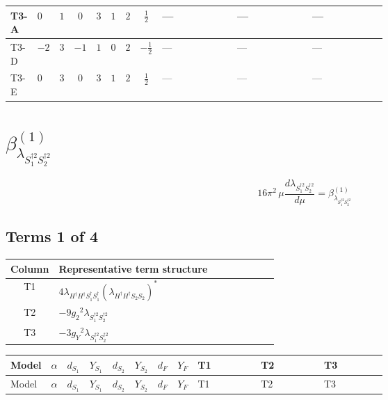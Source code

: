\documentclass[8pt]{article}
\begin{document}
\begin{landscape}
\begin{longtable}{@{}llcccccc >{\raggedright\arraybackslash}p{0.21\linewidth} >{\raggedright\arraybackslash}p{0.21\linewidth} >{\raggedright\arraybackslash}p{0.21\linewidth}@{}}
\midrule
T3-A & $0$ & $1$ & $0$ & $3$ & $1$ & $2$ & $\frac{1}{2}$ & --- & --- & --- \\
\midrule
T3-D & $-2$ & $3$ & $-1$ & $1$ & $0$ & $2$ & $-\frac{1}{2}$ & --- & --- & --- \\
\midrule
T3-E & $0$ & $3$ & $0$ & $3$ & $1$ & $2$ & $\frac{1}{2}$ & --- & --- & --- \\
\midrule
\bottomrule
\end{longtable}
\clearpage
\section*{$\beta_{\lambda_{S_1^{\dagger 2}S_2^{\dagger 2}}}^{(1)}$}
\[16\pi^2\,\mu\frac{d \lambda_{S_1^{\dagger 2}S_2^{\dagger 2}}}{d\mu}=\beta_{\lambda_{S_1^{\dagger 2}S_2^{\dagger 2}}}^{(1)}\]
\subsection*{Terms 1 of 4}
\begin{center}
\begin{tabular}{@{}c >{\raggedright\arraybackslash}p{0.82\linewidth}@{}}
\toprule
Column & Representative term structure \\
\midrule
T1 & \(\displaystyle 4 {\lambda_{H^\dagger H^\dagger S_1^\dagger S_1^\dagger}} \left({\lambda_{H^\dagger H^\dagger S_2 S_2}}\right)^{*}\) \\
\midrule
T2 & \(\displaystyle -9 {g_2}^2 {\lambda_{S_1^{\dagger 2}S_2^{\dagger 2}}}\) \\
\midrule
T3 & \(\displaystyle -3 {g_Y}^2 {\lambda_{S_1^{\dagger 2}S_2^{\dagger 2}}}\) \\
\midrule
\bottomrule
\end{tabular}
\end{center}
\smallskip
\tiny
\begin{longtable}{@{}llcccccc >{\raggedright\arraybackslash}p{0.21\linewidth} >{\raggedright\arraybackslash}p{0.21\linewidth} >{\raggedright\arraybackslash}p{0.21\linewidth}@{}}
\toprule
Model & $\alpha$ & $d_{S_1}$ & $Y_{S_1}$ & $d_{S_2}$ & $Y_{S_2}$ & $d_F$ & $Y_F$ & T1 & T2 & T3 \\
\midrule
\endfirsthead
\toprule
Model & $\alpha$ & $d_{S_1}$ & $Y_{S_1}$ & $d_{S_2}$ & $Y_{S_2}$ & $d_F$ & $Y_F$ & T1 & T2 & T3 \\
\midrule
\endhead

\end{longtable}
\end{landscape}
\end{document}
